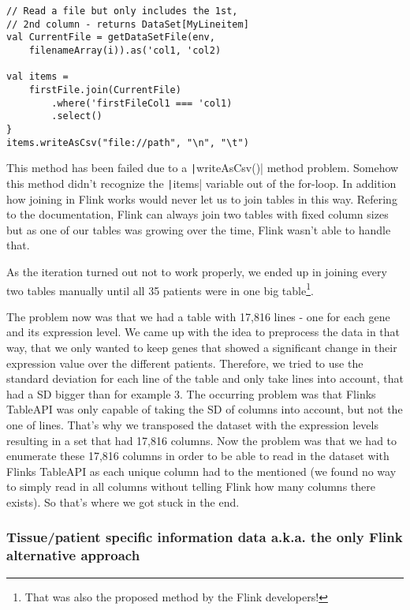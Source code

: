 \documentclass{bioinfo}
\begin{document}
\begin{methods}
\begin{verbatim}
// Read a file but only includes the 1st,
// 2nd column - returns DataSet[MyLineitem]
val CurrentFile = getDataSetFile(env,
	filenameArray(i)).as('col1, 'col2)

val items =
	firstFile.join(CurrentFile)
		.where('firstFileCol1 === 'col1)
		.select()
}
items.writeAsCsv("file://path", "\n", "\t")
\end{verbatim}

This method has been failed due to a \texttt|writeAsCsv()| method problem. Somehow this method didn't recognize the \texttt|items| variable out of the for-loop. In addition how joining in Flink works would never let us to join tables in this way. Refering to the documentation, Flink can always join two tables with fixed column sizes but as one of our tables was growing over the time, Flink wasn't able to handle that.

As the iteration turned out not to work properly, we ended up in joining every two tables manually until all 35 patients were in one big table\footnote{That was also the proposed method by the Flink developers!}.


The problem now was that we had a table with 17,816 lines - one for each gene and its expression level. We came up with the idea to preprocess the data in that way, that we only wanted to keep genes that showed a significant change in their expression value over the different patients. Therefore, we tried to use the standard deviation for each line of the table and only take lines into account, that had a SD bigger than for example 3. The occurring problem was that Flinks TableAPI was only capable of taking the SD of columns into account, but not the one of lines. That’s why we transposed the dataset with the expression levels resulting in a set that had 17,816 columns. Now the problem was that we had to enumerate these 17,816 columns in order to be able to read in the dataset with Flinks TableAPI as each unique column had to the mentioned (we found no way to simply read in all columns without telling Flink how many columns there exists). So that's where we got stuck in the end.


\subsubsection{Tissue/patient specific information data a.k.a. the only Flink alternative approach}


\end{methods}
\end{document}
